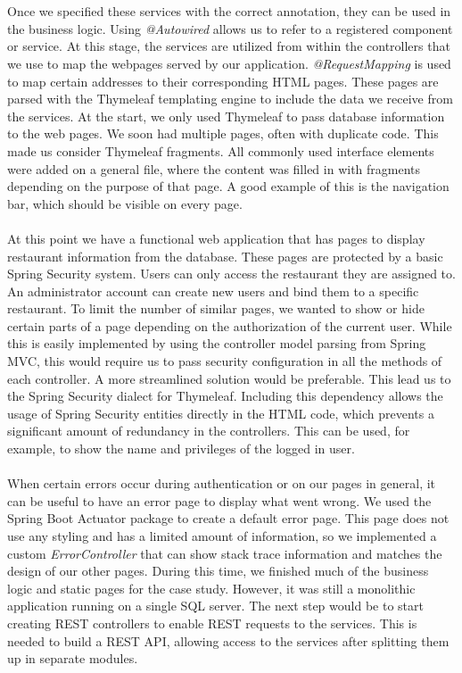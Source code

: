 \documentclass[12pt]{article}
\begin{document}
\begin{multicols}{2}
\\\\
Once we specified these services with the correct annotation, they can be used in the business logic. Using \textit{@Autowired} allows us to refer to a registered component or service. At this stage, the services are utilized from within the controllers that we use to map the webpages served by our application. \textit{@RequestMapping} is used to map certain addresses to their corresponding HTML pages. These pages are parsed with the Thymeleaf templating engine to include the data we receive from the services. At the start, we only used Thymeleaf to pass database information to the web pages. We soon had multiple pages, often with duplicate code. This made us consider Thymeleaf fragments. All commonly used interface elements were added on a general file, where the content was filled in with fragments depending on the purpose of that page. A good example of this is the navigation bar, which should be visible on every page.
\\\\
At this point we have a functional web application that has pages to display restaurant information from the database. These pages are protected by a basic Spring Security system. Users can only access the restaurant they are assigned to. An administrator account can create new users and bind them to a specific restaurant. To limit the number of similar pages, we wanted to show or hide certain parts of a page depending on the authorization of the current user. While this is easily implemented by using the controller model parsing from Spring MVC, this would require us to pass security configuration in all the methods of each controller. A more streamlined solution would be preferable. This lead us to the Spring Security dialect for Thymeleaf. Including this dependency allows the usage of Spring Security entities directly in the HTML code, which prevents a significant amount of redundancy in the controllers. This can be used, for example, to show the name and privileges of the logged in user.
\\\\
When certain errors occur during authentication or on our pages in general, it can be useful to have an error page to display what went wrong. We used the Spring Boot Actuator package to create a default error page. This page does not use any styling and has a limited amount of information, so we implemented a custom \textit{ErrorController} that can show stack trace information and matches the design of our other pages. During this time, we finished much of the business logic and static pages for the case study. However, it was still a monolithic application running on a single SQL server. The next step would be to start creating REST controllers to enable REST requests to the services. This is needed to build a REST API, allowing access to the services after splitting them up in separate modules.

\end{multicols}
\end{document}

